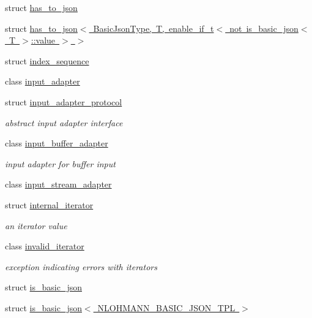 \begin{DoxyCompactItemize}
struct \mbox{\hyperlink{structnlohmann_1_1detail_1_1has__to__json}{has\+\_\+to\+\_\+json}}
\item 
struct \mbox{\hyperlink{structnlohmann_1_1detail_1_1has__to__json_3_01BasicJsonType_00_01T_00_01enable__if__t_3_01not_01737900a749c335e922e2f74e2face5e4}{has\+\_\+to\+\_\+json$<$ Basic\+Json\+Type, T, enable\+\_\+if\+\_\+t$<$ not is\+\_\+basic\+\_\+json$<$ T $>$\+::value $>$ $>$}}
\item 
struct \mbox{\hyperlink{structnlohmann_1_1detail_1_1index__sequence}{index\+\_\+sequence}}
\item 
class \mbox{\hyperlink{classnlohmann_1_1detail_1_1input__adapter}{input\+\_\+adapter}}
\item 
struct \mbox{\hyperlink{structnlohmann_1_1detail_1_1input__adapter__protocol}{input\+\_\+adapter\+\_\+protocol}}
\begin{DoxyCompactList}\small\item\em abstract input adapter interface \end{DoxyCompactList}\item 
class \mbox{\hyperlink{classnlohmann_1_1detail_1_1input__buffer__adapter}{input\+\_\+buffer\+\_\+adapter}}
\begin{DoxyCompactList}\small\item\em input adapter for buffer input \end{DoxyCompactList}\item 
class \mbox{\hyperlink{classnlohmann_1_1detail_1_1input__stream__adapter}{input\+\_\+stream\+\_\+adapter}}
\item 
struct \mbox{\hyperlink{structnlohmann_1_1detail_1_1internal__iterator}{internal\+\_\+iterator}}
\begin{DoxyCompactList}\small\item\em an iterator value \end{DoxyCompactList}\item 
class \mbox{\hyperlink{classnlohmann_1_1detail_1_1invalid__iterator}{invalid\+\_\+iterator}}
\begin{DoxyCompactList}\small\item\em exception indicating errors with iterators \end{DoxyCompactList}\item 
struct \mbox{\hyperlink{structnlohmann_1_1detail_1_1is__basic__json}{is\+\_\+basic\+\_\+json}}
\item 
struct \mbox{\hyperlink{structnlohmann_1_1detail_1_1is__basic__json_3_01NLOHMANN__BASIC__JSON__TPL_01_4}{is\+\_\+basic\+\_\+json$<$ N\+L\+O\+H\+M\+A\+N\+N\+\_\+\+B\+A\+S\+I\+C\+\_\+\+J\+S\+O\+N\+\_\+\+T\+P\+L $>$}}

\end{DoxyCompactItemize}
